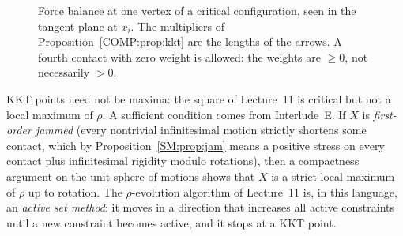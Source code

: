 \begin{figure}[ht]
\centering
{}
\caption{Force balance at one vertex of a critical configuration, seen in the tangent plane at $x_i$. The
multipliers of Proposition~\ref{COMP:prop:kkt} are the lengths of the arrows. A fourth contact with zero
weight is allowed: the weights are $\ge0$, not necessarily $>0$.}
\label{COMP:fig:forces}
\end{figure}

\begin{remark}
KKT points need not be maxima: the square of Lecture~11 is critical but not a local maximum of $\rho$. A
sufficient condition comes from Interlude~E. If $X$ is \emph{first-order jammed} (every nontrivial
infinitesimal motion strictly shortens some contact, which by Proposition~\ref{SM:prop:jam} means a positive
stress on every contact plus infinitesimal rigidity modulo rotations), then a compactness argument on the
unit sphere of motions shows that $X$ is a strict local maximum of $\rho$ up to rotation. The
$\rho$-evolution algorithm of Lecture~11 is, in this language, an \emph{active set method}: it moves in a
direction that increases all active constraints until a new constraint becomes active, and it stops at a
KKT point.
\end{remark}

